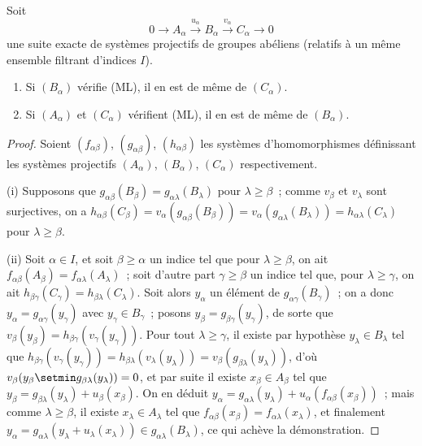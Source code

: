 \begin{proposition}[13.2.1]
\label{0.13.2.1-fr}
Soit
\[
0\longrightarrow A_\alpha\xrightarrow{u_\alpha}B_\alpha
\xrightarrow{v_\alpha}C_\alpha\longrightarrow0
\]
une suite exacte de systèmes projectifs de groupes abéliens (relatifs
à un même ensemble filtrant d'indices $I$).
\begin{enumerate}
\item[\emph{(i)}]
Si $(B_\alpha)$ vérifie \textup{(ML)}, il en est de même de $(C_\alpha)$.
\item[\emph{(ii)}]
Si $(A_\alpha)$ et $(C_\alpha)$ vérifient \textup{(ML)}, il en est de même de
$(B_\alpha)$.
\end{enumerate}
\end{proposition}

\begin{proof}
Soient $(f_{\alpha\beta})$, $(g_{\alpha\beta})$, $(h_{\alpha\beta})$ les
systèmes d'homomorphismes définissant les systèmes projectifs
$(A_\alpha)$, $(B_\alpha)$, $(C_\alpha)$ respectivement.

(i) Supposons que
$g_{\alpha\beta}(B_\beta)=g_{\alpha\lambda}(B_\lambda)$ pour
$\lambda\geq\beta$~; comme $v_\beta$ et $v_\lambda$ sont surjectives, on a
$h_{\alpha\beta}(C_\beta)=v_\alpha(g_{\alpha\beta}(B_\beta))=v_\alpha(g_{\alpha\lambda}(B_\lambda))=h_{\alpha\lambda}(C_\lambda)$
pour $\lambda\geq\beta$.

(ii) Soit $\alpha\in I$, et soit $\beta\geq\alpha$ un indice tel que pour
$\lambda\geq\beta$, on ait
$f_{\alpha\beta}(A_\beta)=f_{\alpha\lambda}(A_\lambda)$~; soit d'autre
part $\gamma\geq\beta$ un indice tel que, pour $\lambda\geq\gamma$, on ait
$h_{\beta\gamma}(C_\gamma)=h_{\beta\lambda}(C_\lambda)$. Soit alors
$y_\alpha$ un élément de $g_{\alpha\gamma}(B_\gamma)$~; on a donc
$y_\alpha=g_{\alpha\gamma}(y_\gamma)$ avec $y_\gamma\in B_\gamma$~;
posons $y_\beta=g_{\beta\gamma}(y_\gamma)$, de sorte que
$v_\beta(y_\beta)=h_{\beta\gamma}(v_\gamma(y_\gamma))$. Pour tout
$\lambda\geq\gamma$, il existe par hypothèse $y_\lambda\in B_\lambda$ tel
que
$h_{\beta\gamma}(v_\gamma(y_\gamma))
=h_{\beta\lambda}(v_\lambda(y_\lambda))
=v_\beta(g_{\beta\lambda}(y_\lambda))$, d'où
$v_\beta(y_\beta\setmin g_{\beta\lambda}(y_\lambda))=0$, et par suite il existe
$x_\beta\in A_\beta$
tel que
$y_\beta=g_{\beta\lambda}(y_\lambda)+u_\beta(x_\beta)$. On en déduit
$y_\alpha=g_{\alpha\lambda}(y_\lambda)+u_\alpha(f_{\alpha\beta}(x_\beta))$~;
mais comme $\lambda\geq\beta$, il existe $x_\lambda\in A_\lambda$ tel que
$f_{\alpha\beta}(x_\beta)=f_{\alpha\lambda}(x_\lambda)$, et finalement
$y_\alpha=g_{\alpha\lambda}(y_\lambda+u_\lambda(x_\lambda))\in g_{\alpha\lambda}(B_\lambda)$,
ce qui achève la démonstration.
\end{proof}

